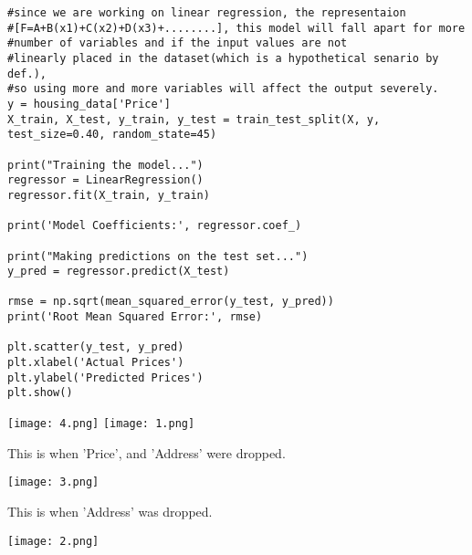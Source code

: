 \documentclass{article}
\begin{document}
\begin{verbatim}
#since we are working on linear regression, the representaion
#[F=A+B(x1)+C(x2)+D(x3)+........], this model will fall apart for more
#number of variables and if the input values are not 
#linearly placed in the dataset(which is a hypothetical senario by def.),
#so using more and more variables will affect the output severely.
y = housing_data['Price']
X_train, X_test, y_train, y_test = train_test_split(X, y, test_size=0.40, random_state=45)

print("Training the model...")
regressor = LinearRegression()
regressor.fit(X_train, y_train)

print('Model Coefficients:', regressor.coef_)

print("Making predictions on the test set...")
y_pred = regressor.predict(X_test)

rmse = np.sqrt(mean_squared_error(y_test, y_pred))
print('Root Mean Squared Error:', rmse)

plt.scatter(y_test, y_pred)
plt.xlabel('Actual Prices')
plt.ylabel('Predicted Prices')
plt.show()
\end{verbatim}
\vspace{1\baselineskip}
\texttt{[image: 4.png]}
\texttt{[image: 1.png]}

\vspace{8\baselineskip}
This is when 'Price', and 'Address' were dropped.

\texttt{[image: 3.png]}

\vspace{16\baselineskip}

This is when 'Address' was dropped.

\texttt{[image: 2.png]}
\end{document}
